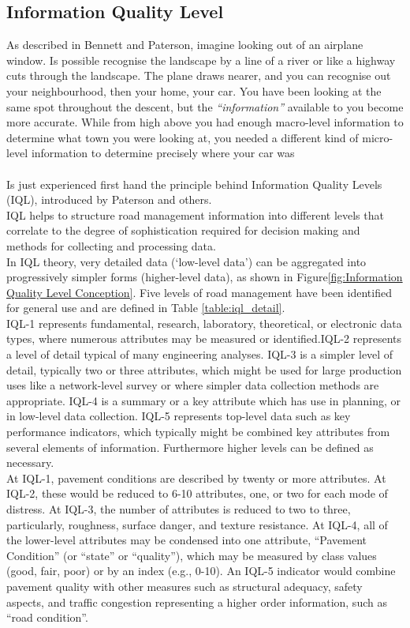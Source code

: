 \documentclass[tesi]{subfiles}
\begin{document}
\subsection{Information Quality Level}\label{ssc:Information Quality Level}
\noindent As described in Bennett and Paterson\cite{bennett2000guide}, imagine looking out of an airplane window. Is possible recognise the landscape by a line of a river or like a highway cuts through the landscape. The plane draws nearer, and you can recognise out your neighbourhood, then your home, your car. You have been looking at the same spot throughout the descent, but the \textit{“information”} available to you become more accurate. While from high above you had enough macro-level information to determine what town you were looking at, you needed a different kind of micro-level information to determine precisely where your car was
\\\\
Is just experienced first hand the principle behind Information Quality Levels (IQL), introduced by Paterson and others\cite{paterson2}.\\ IQL helps to structure road management information into different levels that correlate to the degree of sophistication required for decision making and methods for collecting and processing data.
\\
In IQL theory, very detailed data (‘low-level data’) can be aggregated into progressively simpler forms (higher-level data), as shown in Figure\ref{fig:Information Quality Level Conception}. Five levels of road management have been identified for general use and are defined in Table \ref{table:iql_detail}.
\\
\noindent IQL-1 represents fundamental, research, laboratory, theoretical, or electronic data types, where numerous attributes may be measured or identified.IQL-2 represents a level of detail typical of many engineering analyses.
IQL-3 is a simpler level of detail, typically two or three attributes, which might be used for large production uses like a network-level survey or where simpler data collection methods are appropriate.
IQL-4 is a summary or a key attribute which has use in planning, or in low-level data collection.
IQL-5 represents top-level data such as key performance indicators, which typically might be combined key attributes from several elements of information. Furthermore higher levels can be defined as necessary. \\
At IQL-1, pavement conditions are described by twenty or more attributes.
At IQL-2, these would be reduced to 6-10 attributes, one, or two for each mode of distress.
 At IQL-3, the number of attributes is reduced to two to three, particularly, roughness, surface danger, and texture resistance.
At IQL-4, all of the lower-level attributes may be condensed into one attribute, “Pavement Condition” (or “state” or “quality”), which may be measured by class values (good, fair, poor) or by an index (e.g., 0-10).
An IQL-5 indicator would combine pavement quality with other measures such as structural adequacy, safety aspects, and traffic congestion representing a higher order information, such as “road condition”.\\
\end{document}
